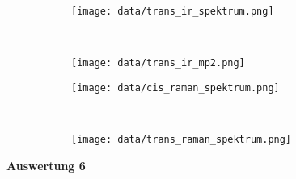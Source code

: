 \documentclass[12pt]{article}
\begin{document}
\begin{onehalfspace}
\begin{figure}[!hptb]
    \centering
    \begin{subfigure}[b]{0.4\textwidth}
        \texttt{[image: data/trans\_ir\_spektrum.png]}
    \end{subfigure}
    ~ %
    \begin{subfigure}[b]{0.4\textwidth}
        \texttt{[image: data/trans\_ir\_mp2.png]}
    \end{subfigure}
\end{figure}


\begin{figure}[!hptb]
    \centering
    \begin{subfigure}[b]{0.4\textwidth}
        \texttt{[image: data/cis\_raman\_spektrum.png]}
    \end{subfigure}
    ~ %
    \begin{subfigure}[b]{0.4\textwidth}
        \texttt{[image: data/trans\_raman\_spektrum.png]}
    \end{subfigure}
\end{figure}

\textbf{Auswertung 6}
\end{onehalfspace}
\end{document}
